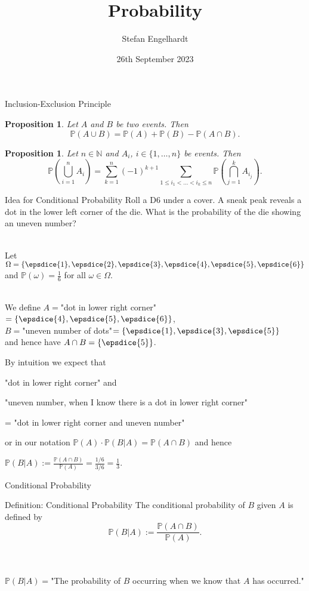\documentclass[11pt,pdf,ngerman,UKenglish]{beamer}%
\title{Probability}
\author{Stefan Engelhardt}
\date{26th September 2023}%
\newcommand{\IN}{\mathds{N}}
\newcommand{\IP}{\mathbb{P}}
\newcommand{\1}{\mathbb{1}}
\theoremstyle{thm}
\newtheorem{proposition}[theorem]{Proposition}
\theoremstyle{def}
\begin{document}
\begin{frame}
\titlepage
\end{frame}
\logo{}



\begin{frame}{Inclusion-Exclusion Principle}
\begin{proposition}
Let $A$ and $B$ be two events. Then
$$\IP(A \cup B) = \IP(A) + \IP(B) - \IP(A \cap B).$$
\end{proposition}

\begin{proposition}
Let $n \in \IN$ and $A_i$, $i\in \{ 1, \ldots, n \}$ be events. Then
$$\IP\left(\bigcup_{i=1}^n A_i \right) = \sum_{k=1}^n (-1)^{k+1} \sum\limits_{1 \leq i_1 < \ldots < i_k \leq n} \IP\left( \bigcap_{j=1}^k A_{i_j}\right).$$
\end{proposition}
\end{frame}


\begin{frame}{Idea for Conditional Probability}
Roll a D6 under a cover. A sneak peak reveals a dot in the lower left corner of the die.
What is the probability of the die showing an uneven number?

\ \\
Let $\Omega = \{ \epsdice{1}, \epsdice{2}, \epsdice{3}, \epsdice{4}, \epsdice{5}, \epsdice{6} \}$ and $\IP(\omega)=\frac16$ for all $\omega \in \Omega$.

\ \\
We define
$A=$"dot in lower right corner"$=\{ \epsdice{4}, \epsdice{5}, \epsdice{6} \}$,
\\
$B=$"uneven number of dots"$=\{ \epsdice{1}, \epsdice{3}, \epsdice{5} \}$
\\
and hence have $A \cap B = \{ \epsdice{5} \}$.

\pause
By intuition we expect that

"dot in lower right corner" and 

"uneven number, when I know there is a dot in lower right corner" 

= "dot in lower right corner and uneven number"

or in our notation $\IP(A) \cdot \IP(B \vert A) = \IP(A \cap B)$ and hence

$\IP(B \vert A) := \frac{\IP(A \cap B)}{\IP(A)} = \frac{1/6}{3/6} = \frac13$.
\end{frame}

\begin{frame}{Conditional Probability}
\begin{block}{Definition: Conditional Probability}
The conditional probability of $B$ given $A$ is defined by
$$\IP(B \vert A) := \frac{\IP(A \cap B)}{\IP(A)}.$$
\end{block}
\ \\ \ \\
$\IP( B \vert A)=$"The probability of $B$ occurring when we know that $A$ has occurred."
\end{frame}
\end{document}
